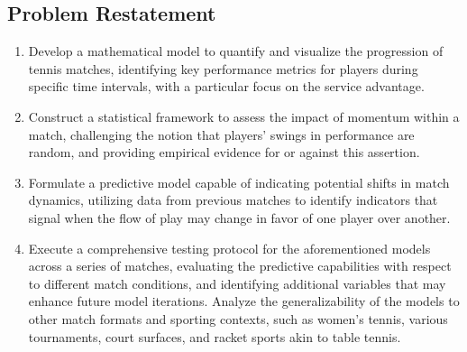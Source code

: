 \documentclass[12pt]{article}
\begin{document}
\subsection{Problem Restatement}
\begin{enumerate}
\item  Develop a mathematical model to quantify and visualize the progression of tennis matches, identifying key performance metrics for players during specific time intervals, with a particular focus on the service advantage.
\item Construct a statistical framework to assess the impact of momentum within a match, challenging the notion that players' swings in performance are random, and providing empirical evidence for or against this assertion.
\item Formulate a predictive model capable of indicating potential shifts in match dynamics, utilizing data from previous matches to identify indicators that signal when the flow of play may change in favor of one player over another.
\item Execute a comprehensive testing protocol for the aforementioned models across a series of matches, evaluating the predictive capabilities with respect to different match conditions, and identifying additional variables that may enhance future model iterations. Analyze the generalizability of the models to other match formats and sporting contexts, such as women's tennis, various tournaments, court surfaces, and racket sports akin to table tennis.
\end{enumerate}
\end{document}

